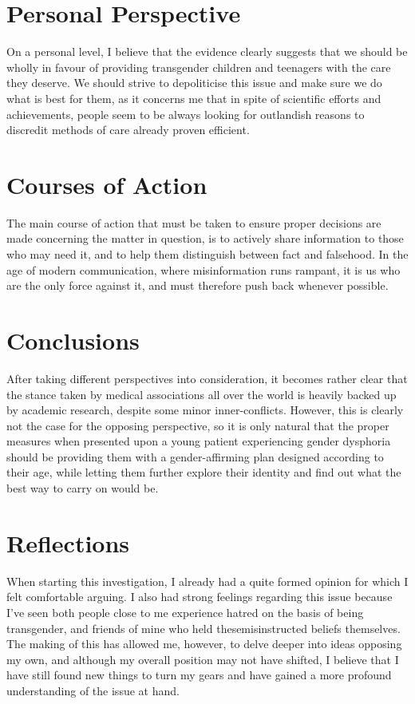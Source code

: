 \documentclass{article}
\begin{document}
\section{Personal Perspective}

On a personal level, I believe that the evidence clearly suggests that we should be wholly in favour of providing transgender children and teenagers with the care they deserve. We should strive to depoliticise this issue and make sure we do what is best for them, as it concerns me that in spite of scientific efforts and achievements, people seem to be always looking for outlandish reasons to discredit methods of care already proven efficient.

\section{Courses of Action}

The main course of action that must be taken to ensure proper decisions are made concerning the matter in question, is to actively share information to those who may need it, and to help them distinguish between fact and falsehood. In the age of modern communication, where misinformation runs rampant, it is us who are the only force against it, and must therefore push back whenever possible. 

\section{Conclusions}

After taking different perspectives into consideration, it becomes rather clear that the stance taken by medical associations all over the world is heavily backed up by academic research, despite some minor inner-conflicts. However, this is clearly not the case for the opposing perspective, so it is only natural that the proper measures when presented upon a young patient experiencing gender dysphoria should be providing them with a gender-affirming plan designed according to their age, while letting them further explore their identity and find out what the best way to carry on would be.

\section{Reflections}
	
When starting this investigation, I already had a quite formed opinion for which I felt comfortable arguing. I also had strong feelings regarding this issue because I’ve seen both people close to me experience hatred on the basis of being transgender, and friends of mine who held thesemisinstructed beliefs themselves. The making of this has allowed me, however, to delve deeper into ideas opposing my own, and although my overall position may not have shifted, I believe that I have still found new things to turn my gears and have gained a more profound understanding of the issue at hand.\par
\end{document}
